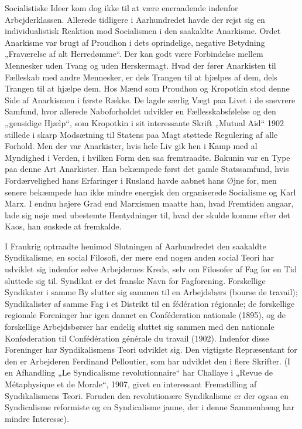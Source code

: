 \documentclass[12pt,a4paper,openany]{book}
\newcommand{\opage}[1]{\marginnote{\footnotesize\textit{[#1]}}}
\begin{document}
Socialistiske Ideer kom dog ikke til at være eneraadende indenfor
Arbejderklassen. Allerede tidligere i Aarhundredet havde der rejst
sig en individualistisk Reaktion mod Socialismen i den saakaldte
Anarkisme. Ordet Anarkisme var brugt af Proudhon i dets oprindelige,
negative Betydning „Fraværelse af alt Herredømme“. Der
kan godt være Forbindelse mellem Mennesker uden Tvang og uden
Herskermagt. Hvad der fører Anarkisten til Fælleskab med andre
Mennesker, er dels Trangen til at hjælpes af dem, dels Trangen til
at hjælpe dem. Hos Mænd som Proudhon og Kropotkin stod denne
Side af Anarkismen i første Række. De lagde særlig Vægt paa Livet
i de snevrere Samfund, hvor allerede Naboforholdet udvikler en Fællesskabsfølelse
og den „gensidige Hjælp“, som Kropotkin i sit interessante
Skrift „Mutual Aid“ 1902 stillede i skarp Modsætning til
Statens paa Magt støttede Regulering af alle Forhold. Men der var
Anarkister, hvis hele Liv gik hen i Kamp med al Myndighed i Verden,
i hvilken Form den saa fremtraadte. Bakunin var en Type paa
denne Art Anarkister. Han bekæmpede først det gamle Statssamfund,
hvis Fordærvelighed hans Erfaringer i Rusland havde aabnet
hans Øjne for, men senere bekæmpede han ikke mindre energisk
den organiserede Socialisme og Karl Marx. I endnu højere Grad
end Marxismen maatte han, hvad Fremtiden angaar, lade sig nøje
\opage{98}med ubestemte Hentydninger til, hvad der skulde komme efter det
Kaos, han ønskede at fremkalde.

I Frankrig optraadte henimod Slutningen af Aarhundredet den
saakaldte Syndikalisme, en social Filosofi, der mere end nogen anden
social Teori har udviklet sig indenfor selve Arbejdernes Kreds,
selv om Filosofer af Fag for en Tid sluttede sig til. Syndikat er det
franske Navn for Fagforening. Forskellige Syndikater i samme By
slutter sig sammen til en Arbejdsbørs (bourse de travail); Syndikalister
af samme Fag i et Distrikt til en fédération régionale; de forskellige
regionale Foreninger har igen dannet en Conféderation nationale
(1895), og de forskellige Arbejdsbørser har endelig sluttet sig sammen
med den nationale Konføderation til Confédération générale du
travail (1902). Indenfor disse Foreninger har Syndikalismens Teori
udviklet sig. Den vigtigste Repræsentant for den er Arbejderen Ferdinand
Pelloutier, som har udviklet den i flere Skrifter. (I en Afhandling
„Le Syndicalisme revolutionnaire“ har Challaye i „Revue
de Métaphysique et de Morale“, 1907, givet en interessant Fremstilling
af Syndikalismens Teori. Foruden den revolutionære Syndikalisme
er der ogsaa en Syndicalisme reformiste og en Syndicalisme
jaune, der i denne Sammenhæng har mindre Interesse).
\end{document}
